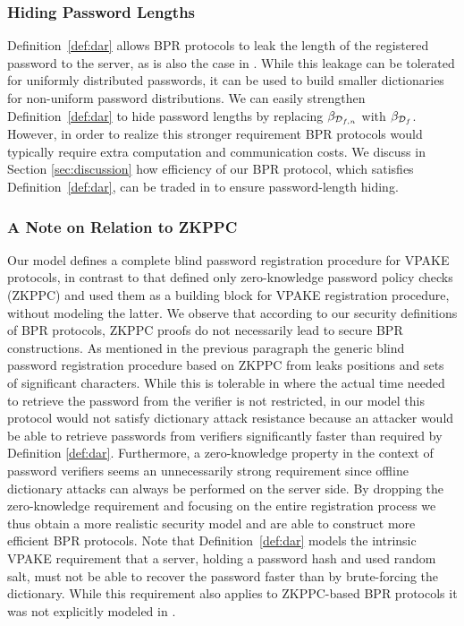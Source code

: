 \subsubsection{Hiding Password Lengths}\label{sec:strongerDAR}
Definition~\ref{def:dar} allows BPR protocols to leak the length of the registered password to the server, as is also the case in \cite{KieferM14}. While this leakage can be tolerated for uniformly distributed passwords, it can be used to build smaller dictionaries for non-uniform password distributions. We can easily strengthen Definition~\ref{def:dar} to hide password lengths by replacing $\beta_{\mathcal{D}_{f,n}}$ with $\beta_{\mathcal{D}_f}$. However, in order to realize this stronger requirement BPR protocols would typically require extra computation and communication costs. We discuss in Section \ref{sec:discussion} how efficiency of our BPR protocol, which satisfies Definition~\ref{def:dar}, can be traded in to ensure password-length hiding.

\subsubsection{A Note on Relation to ZKPPC}
Our model defines a complete blind password registration procedure for VPAKE protocols, in contrast to \cite{KieferM14} that defined only zero-knowledge password policy checks (ZKPPC) and used them as a building block for VPAKE registration procedure, without modeling the latter. We observe that according to our security definitions of BPR protocols, ZKPPC proofs do not necessarily lead to secure BPR constructions. As mentioned in the previous paragraph the generic blind password registration procedure based on ZKPPC from \cite{KieferM14} leaks positions and sets of significant characters. While this is tolerable in \cite{KieferM14} where the actual time needed to retrieve the password from the verifier is not restricted, in our model this protocol would not satisfy dictionary attack resistance because an attacker would be able to retrieve passwords from verifiers significantly faster than required by Definition \ref{def:dar}.
Furthermore, a zero-knowledge property in the context of password verifiers seems an unnecessarily strong requirement since offline dictionary attacks can always be performed on the server side.
By dropping the zero-knowledge requirement and focusing on the entire registration process we thus obtain a more realistic security model and are able to construct more efficient BPR protocols.
Note that Definition~\ref{def:dar} models the intrinsic VPAKE requirement that a server, holding a password hash and used random salt, must not be able to recover the password faster than by brute-forcing the dictionary. While this requirement also applies to ZKPPC-based BPR protocols it was not explicitly modeled in \cite{KieferM14}.


